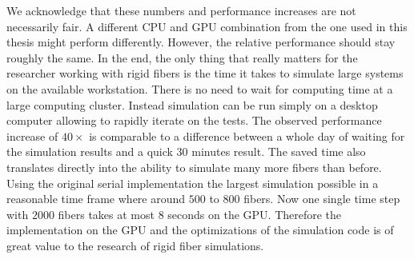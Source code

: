 We acknowledge that these numbers and performance increases are not necessarily fair. A different CPU and GPU combination from the one used in this thesis might perform differently. However, the relative performance should stay roughly the same. In the end, the only thing that really matters for the researcher working with rigid fibers is the time it takes to simulate large systems on the available workstation. There is no need to wait for computing time at a large computing cluster. Instead simulation can be run simply on a desktop computer allowing to rapidly iterate on the tests. The observed performance increase of $40×$ is comparable to a difference between a whole day of waiting for the simulation results and a quick $30$ minutes result. The saved time also translates directly into the ability to simulate many more fibers than before. Using the original serial implementation the largest simulation possible in a reasonable time frame where around $500$ to $800$ fibers. Now one single time step with $2000$ fibers takes at most $8$ seconds on the GPU. Therefore the implementation on the GPU and the optimizations of the simulation code is of great value to the research of rigid fiber simulations.
